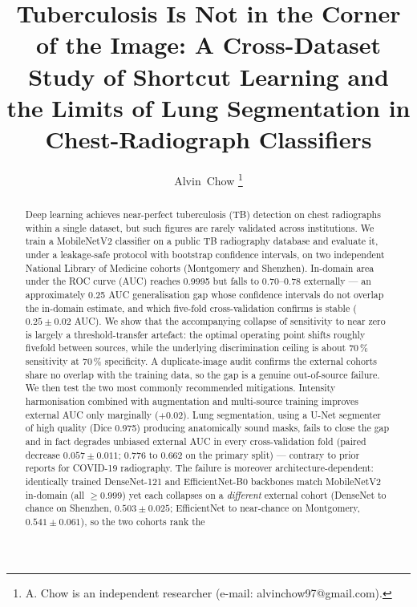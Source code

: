 \documentclass[journal]{IEEEtran}
\begin{document}
\title{Tuberculosis Is Not in the Corner of the Image: A Cross-Dataset Study of
Shortcut Learning and the Limits of Lung Segmentation in Chest-Radiograph
Classifiers}

\author{Alvin~Chow%
\thanks{A. Chow is an independent researcher (e-mail: alvinchow97@gmail.com).}}

\maketitle

\begin{abstract}
Deep learning achieves near-perfect tuberculosis (TB) detection on chest
radiographs within a single dataset, but such figures are rarely validated
across institutions. We train a MobileNetV2 classifier on a public TB
radiography database and evaluate it, under a leakage-safe protocol with
bootstrap confidence intervals, on two independent National Library of Medicine
cohorts (Montgomery and Shenzhen). In-domain area under the ROC curve (AUC)
reaches 0.9995 but falls to 0.70--0.78 externally --- an approximately 0.25 AUC
generalisation gap whose confidence intervals do not overlap the in-domain
estimate, and which five-fold cross-validation confirms is stable
($0.25 \pm 0.02$ AUC). We show that the accompanying collapse of sensitivity to
near zero is largely a threshold-transfer artefact: the optimal operating point
shifts roughly fivefold between sources, while the underlying discrimination
ceiling is about 70\,\% sensitivity at 70\,\% specificity. A duplicate-image
audit confirms the external cohorts share no overlap with the training data, so
the gap is a genuine out-of-source failure. We then test the two most commonly
recommended mitigations. Intensity harmonisation combined with augmentation and
multi-source training improves external AUC only marginally ($+0.02$). Lung
segmentation, using a U-Net segmenter of high quality (Dice 0.975) producing
anatomically sound masks, fails to close the gap and in fact degrades unbiased
external AUC in every cross-validation fold (paired decrease $0.057 \pm 0.011$;
0.776 to 0.662 on the primary split) --- contrary to prior reports for COVID-19
radiography. The failure is moreover architecture-dependent: identically
trained DenseNet-121 and EfficientNet-B0 backbones match MobileNetV2 in-domain
(all $\geq 0.999$) yet each collapses on a \emph{different} external cohort
(DenseNet to chance on Shenzhen, $0.503 \pm 0.025$; EfficientNet to
near-chance on Montgomery, $0.541 \pm 0.061$), so the two cohorts rank the

\end{abstract}
\end{document}
